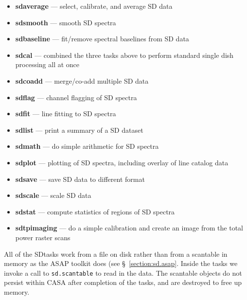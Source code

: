 \begin{itemize}

\item {\bf sdaverage} --- select, calibrate, and average SD data

\item {\bf sdsmooth} --- smooth SD spectra

\item {\bf sdbaseline} --- fit/remove spectral baselines from SD data

\item {\bf sdcal} --- combined the three tasks above to perform standard single dish processing all at once 

\item {\bf sdcoadd} --- merge/co-add multiple SD data

\item {\bf sdflag} --- channel flagging of SD spectra

\item {\bf sdfit} --- line fitting to SD spectra

\item {\bf sdlist} --- print a summary of a SD dataset

\item {\bf sdmath} --- do simple arithmetic for SD spectra 

\item {\bf sdplot} --- plotting of SD spectra, including overlay of line
catalog data

\item {\bf sdsave} --- save SD data to different format

\item {\bf sdscale} --- scale SD data
 
\item {\bf sdstat} --- compute statistics of regions of SD spectra

\item {\bf sdtpimaging} --- do a simple calibration and create an image from the total power raster scans
 

\end{itemize}

All of the SDtasks work from a file on disk rather than from
a scantable in memory as the ASAP toolkit does (see 
\S~\ref{section:sd.asap}.  Inside the tasks we invoke a call
to {\tt sd.scantable} to read in the data.  The scantable objects
do not persist within CASA after completion of the tasks, and
are destroyed to free up memory.

